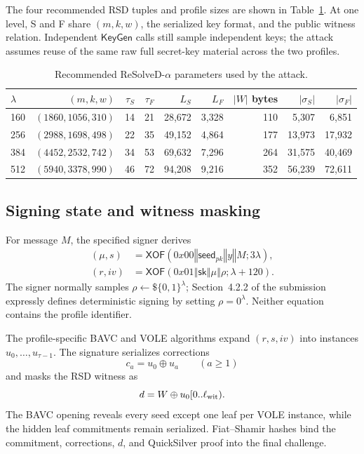 \documentclass[11pt,a4paper]{article}
\newcommand{\bits}{\{0,1\}}
\newcommand{\xor}{\mathbin{\oplus}}
\newcommand{\concat}{\mathbin\Vert}
\newcommand{\KeyGen}{\ensuremath{\mathsf{KeyGen}}}
\newcommand{\sk}{\ensuremath{\mathsf{sk}}}
\newcommand{\sample}{\mathrel{\leftarrow\$}}
\begin{document}
The four recommended RSD tuples and profile sizes are shown in
Table~\ref{tab:params}.  At one level, S and F share $(m,k,w)$, the serialized
key format, and the public witness relation.  Independent \KeyGen{} calls still
sample independent keys; the attack assumes reuse of the same raw full
secret-key material across the two profiles.

\begin{table}[ht]
\centering
\caption{Recommended ReSolveD-$\alpha$ parameters used by the attack.}
\label{tab:params}
\begin{tabular}{lrrrrrrrr}
\toprule
$\lambda$ & $(m,k,w)$ & $\tau_S$ & $\tau_F$ & $L_S$ & $L_F$
 & $|W|$ bytes & $|\sigma_S|$ & $|\sigma_F|$\\
\midrule
160 & $(1860,1056,310)$ & 14 & 21 & 28,672 & 3,328 & 110 & 5,307 & 6,851\\
256 & $(2988,1698,498)$ & 22 & 35 & 49,152 & 4,864 & 177 & 13,973 & 17,932\\
384 & $(4452,2532,742)$ & 34 & 53 & 69,632 & 7,296 & 264 & 31,575 & 40,469\\
512 & $(5940,3378,990)$ & 46 & 72 & 94,208 & 9,216 & 352 & 56,239 & 72,611\\
\bottomrule
\end{tabular}
\end{table}

\subsection{Signing state and witness masking}

For message $M$, the specified signer derives
\begin{align}
 (\mu,s)&=\mathsf{XOF}(0x00\concat\mathsf{seed}_{pk}\concat y\concat M;3\lambda),
                                                               \label{eq:msghash}\\
 (r,iv)&=\mathsf{XOF}(0x01\concat\sk\concat\mu\concat\rho;
                      \lambda+120).                            \label{eq:coinhash}
\end{align}
The signer normally samples $\rho\sample\bits^\lambda$; Section~4.2.2 of the
submission expressly defines deterministic signing by setting
$\rho=0^\lambda$.  Neither equation contains the profile identifier.

The profile-specific BAVC and VOLE algorithms expand $(r,s,iv)$ into instances
$u_0,\ldots,u_{\tau-1}$.  The signature serializes corrections
\begin{equation}
                         c_a=u_0\xor u_a\qquad(a\geq1)          \label{eq:corr}
\end{equation}
and masks the RSD witness as
\begin{equation}
                         d=W\xor u_0[0..\ell_{\rm wit}).       \label{eq:mask}
\end{equation}
The BAVC opening reveals every seed except one leaf per VOLE instance, while
the hidden leaf commitments remain serialized.  Fiat--Shamir hashes bind the
commitment, corrections, $d$, and QuickSilver proof into the final challenge.
\end{document}
